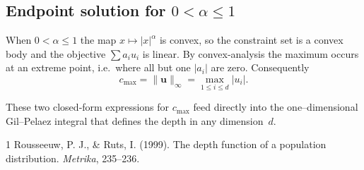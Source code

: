 \subsection*{Endpoint solution for \boldmath$0<\alpha\le1$}

When $0<\alpha\le1$ the map $x\mapsto|x|^\alpha$ is convex, so the constraint
set is a convex body and the objective $\sum a_i u_i$ is linear.  
By convex‐analysis the maximum occurs at an extreme point, i.e.\ where all but
one $|a_i|$ are zero.  Consequently
\[
\boxed{c_{\max}=\|\mathbf u\|_\infty=\max_{1\le i\le d}|u_i|}.
\]

\medskip
These two closed‑form expressions for $c_{\max}$ feed directly into the
one–dimensional Gil–Pelaez integral that defines the depth in any dimension~$d$.

\begin{thebibliography}{1}
 Rousseeuw, P. J., \& Ruts, I. (1999). The depth function of a population distribution. \emph{Metrika}, 235--236.
\end{thebibliography}

